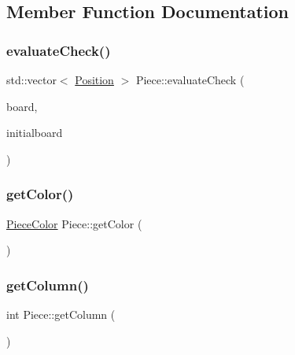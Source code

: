 \subsection{Member Function Documentation}
\mbox{\label{class_piece_a9cb5fe774dcb187ce20ff18c93269e3f}} 
\subsubsection{\texorpdfstring{evaluate\+Check()}{evaluateCheck()}}
{\footnotesize\ttfamily std\+::vector$<$ \hyperlink{struct_position}{Position} $>$ Piece\+::evaluate\+Check (\begin{DoxyParamCaption}\item[{std\+::shared\+\_\+ptr$<$ \hyperlink{class_base_board}{Base\+Board} $>$}]{board,  }\item[{bool}]{initialboard }\end{DoxyParamCaption})}

\mbox{\label{class_piece_a184ce3e31f7b4d8a3d616a60fe60522e}} 
\subsubsection{\texorpdfstring{get\+Color()}{getColor()}}
{\footnotesize\ttfamily \hyperlink{_piece_8h_ad7595c48bb74c0dd2a7648712a2d4985}{Piece\+Color} Piece\+::get\+Color (\begin{DoxyParamCaption}{ }\end{DoxyParamCaption})}

\mbox{\label{class_piece_a3396fcbbe54260076bf2f6a39b0fb920}} 
\subsubsection{\texorpdfstring{get\+Column()}{getColumn()}}
{\footnotesize\ttfamily int Piece\+::get\+Column (\begin{DoxyParamCaption}{ }\end{DoxyParamCaption})}

\mbox{\label{class_piece_a094d0d28514219ab3f155d9241bb8f22}} 
